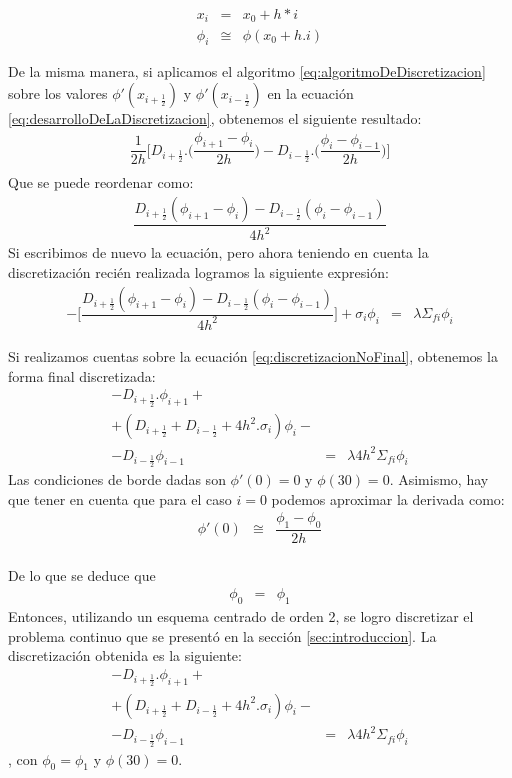 \documentclass[11pt,a4paper]{emulateapj}
\begin{document}
\begin{eqnarray}
	x_i &=&x_0 + h*i \\
	\phi_i &\cong&\phi(x_0 + h.i)
\end{eqnarray}

De la misma manera, si aplicamos el algoritmo \ref{eq:algoritmoDeDiscretizacion} sobre los valores $\phi'(x_{i+\frac{1}{2}})$ y $\phi'(x_{i-\frac{1}{2}})$ en la ecuación \ref{eq:desarrolloDeLaDiscretizacion}, obtenemos el siguiente resultado:
\begin{eqnarray}
\label{eq:desarrolloDeLaDiscretizacion2}
	\dfrac{1}{2h} \bigg[	D_{i+\frac{1}{2}}.\bigg(\dfrac{\phi_{i+1} - \phi_{i}}{2h}\bigg) 	-
			D_{i-\frac{1}{2}}.\bigg(\dfrac{\phi_{i} - \phi_{i-1}}{2h}\bigg) \bigg]\\
\end{eqnarray}
Que se puede reordenar como:
\begin{eqnarray}
\label{eq:reemplazoDeLaDerivada}
	\dfrac{D_{i+\frac{1}{2}}(\phi_{i+1} - \phi_{i}) - D_{i-\frac{1}{2}}(\phi_{i} - \phi_{i-1})}{4h^2}
\end{eqnarray}
Si escribimos de nuevo la ecuación, pero ahora teniendo en cuenta la discretización recién realizada logramos la siguiente expresión:
\begin{eqnarray}
\label{eq:discretizacionNoFinal}
	-\bigg[\dfrac{D_{i+\frac{1}{2}}(\phi_{i+1} - \phi_{i}) - D_{i-\frac{1}{2}}(\phi_{i} - \phi_{i-1})}{4h^2}\bigg]
	+ \sigma_i \phi_i &=& \lambda \Sigma_{fi} \phi_i
\end{eqnarray}

Si realizamos cuentas sobre la ecuación \ref{eq:discretizacionNoFinal}, obtenemos la forma final discretizada:
\begin{eqnarray}
	-D_{i+\frac{1}{2}}.\phi_{i+1} + \\
	+(D_{i+\frac{1}{2}} + D_{i-\frac{1}{2}} + 4h^2.\sigma_i)\phi_{i} - \\
	-D_{i-\frac{1}{2}}\phi_{i-1} &=& \lambda 4h^2 \Sigma_{fi} \phi_i
\end{eqnarray}
Las condiciones de borde dadas son $\phi'(0) = 0$ y $\phi(30) = 0$. Asimismo, hay que tener en cuenta que para el caso $i = 0$ podemos aproximar la derivada como:
\begin{eqnarray}
	\phi'(0) &\cong & \dfrac{\phi_1 - \phi_0}{2h}
\end{eqnarray} \\
De lo que se deduce que
\begin{eqnarray}
	\phi_0 &=& \phi_1
\end{eqnarray}
Entonces, utilizando un esquema centrado de orden 2, se logro discretizar el problema continuo que se presentó en la sección \ref{sec:introduccion}. La discretización obtenida es la siguiente:
\begin{eqnarray}
\label{eq:expresionDicretizacion}
	-D_{i+\frac{1}{2}}.\phi_{i+1} + \\
	+(D_{i+\frac{1}{2}} + D_{i-\frac{1}{2}} + 4h^2.\sigma_i)\phi_{i} - \\
	-D_{i-\frac{1}{2}}\phi_{i-1} &=& \lambda 4h^2 \Sigma_{fi} \phi_i
\end{eqnarray}
, con $\phi_0 = \phi_1$ y $\phi(30) = 0$.
\end{document}
